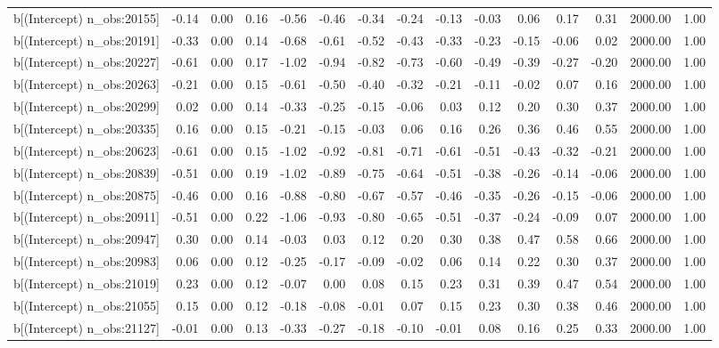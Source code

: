 \begin{table}[ht]
\begin{tabular}{rrrrrrrrrrrrrrr}
  b[(Intercept) n\_obs:20155] & -0.14 & 0.00 & 0.16 & -0.56 & -0.46 & -0.34 & -0.24 & -0.13 & -0.03 & 0.06 & 0.17 & 0.31 & 2000.00 & 1.00 \\ 
  b[(Intercept) n\_obs:20191] & -0.33 & 0.00 & 0.14 & -0.68 & -0.61 & -0.52 & -0.43 & -0.33 & -0.23 & -0.15 & -0.06 & 0.02 & 2000.00 & 1.00 \\ 
  b[(Intercept) n\_obs:20227] & -0.61 & 0.00 & 0.17 & -1.02 & -0.94 & -0.82 & -0.73 & -0.60 & -0.49 & -0.39 & -0.27 & -0.20 & 2000.00 & 1.00 \\ 
  b[(Intercept) n\_obs:20263] & -0.21 & 0.00 & 0.15 & -0.61 & -0.50 & -0.40 & -0.32 & -0.21 & -0.11 & -0.02 & 0.07 & 0.16 & 2000.00 & 1.00 \\ 
  b[(Intercept) n\_obs:20299] & 0.02 & 0.00 & 0.14 & -0.33 & -0.25 & -0.15 & -0.06 & 0.03 & 0.12 & 0.20 & 0.30 & 0.37 & 2000.00 & 1.00 \\ 
  b[(Intercept) n\_obs:20335] & 0.16 & 0.00 & 0.15 & -0.21 & -0.15 & -0.03 & 0.06 & 0.16 & 0.26 & 0.36 & 0.46 & 0.55 & 2000.00 & 1.00 \\ 
  b[(Intercept) n\_obs:20623] & -0.61 & 0.00 & 0.15 & -1.02 & -0.92 & -0.81 & -0.71 & -0.61 & -0.51 & -0.43 & -0.32 & -0.21 & 2000.00 & 1.00 \\ 
  b[(Intercept) n\_obs:20839] & -0.51 & 0.00 & 0.19 & -1.02 & -0.89 & -0.75 & -0.64 & -0.51 & -0.38 & -0.26 & -0.14 & -0.06 & 2000.00 & 1.00 \\ 
  b[(Intercept) n\_obs:20875] & -0.46 & 0.00 & 0.16 & -0.88 & -0.80 & -0.67 & -0.57 & -0.46 & -0.35 & -0.26 & -0.15 & -0.06 & 2000.00 & 1.00 \\ 
  b[(Intercept) n\_obs:20911] & -0.51 & 0.00 & 0.22 & -1.06 & -0.93 & -0.80 & -0.65 & -0.51 & -0.37 & -0.24 & -0.09 & 0.07 & 2000.00 & 1.00 \\ 
  b[(Intercept) n\_obs:20947] & 0.30 & 0.00 & 0.14 & -0.03 & 0.03 & 0.12 & 0.20 & 0.30 & 0.38 & 0.47 & 0.58 & 0.66 & 2000.00 & 1.00 \\ 
  b[(Intercept) n\_obs:20983] & 0.06 & 0.00 & 0.12 & -0.25 & -0.17 & -0.09 & -0.02 & 0.06 & 0.14 & 0.22 & 0.30 & 0.37 & 2000.00 & 1.00 \\ 
  b[(Intercept) n\_obs:21019] & 0.23 & 0.00 & 0.12 & -0.07 & 0.00 & 0.08 & 0.15 & 0.23 & 0.31 & 0.39 & 0.47 & 0.54 & 2000.00 & 1.00 \\ 
  b[(Intercept) n\_obs:21055] & 0.15 & 0.00 & 0.12 & -0.18 & -0.08 & -0.01 & 0.07 & 0.15 & 0.23 & 0.30 & 0.38 & 0.46 & 2000.00 & 1.00 \\ 
  b[(Intercept) n\_obs:21127] & -0.01 & 0.00 & 0.13 & -0.33 & -0.27 & -0.18 & -0.10 & -0.01 & 0.08 & 0.16 & 0.25 & 0.33 & 2000.00 & 1.00 \\ 

\end{tabular}
\end{table}
